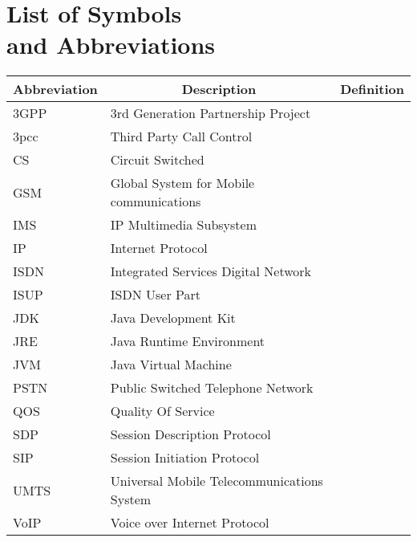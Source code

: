 

\chapter[List of Symbols and Abbreviations]{List of Symbols\\ and Abbreviations}

\begin{center}
\small
\begin{longtable}{lp{3.0in}c}
\toprule
\multicolumn{1}{c}{Abbreviation}
                & \multicolumn{1}{c}{Description}
                                & \multicolumn{1}{c}{Definition}\\ \midrule\addlinespace[2pt] \endhead
\bottomrule\endfoot
3GPP			& 3rd Generation Partnership Project 		& \pref{sym:3GPP}\\
3pcc			& Third Party Call Control						& \pref{sym:3pcc}\\
CS				& Circuit Switched								& \pref{sym:CS}\\
GSM			& Global System for Mobile communications & \pref{sym:GSM}\\
IMS			& IP Multimedia Subsystem						& \pref{sym:IMS}\\
IP				& Internet Protocol								& \pref{sym:IP}\\
ISDN			& Integrated Services Digital Network		& \pref{sym:ISDN}\\
ISUP			& ISDN User Part									& \pref{sym:ISUP}\\
JDK			& Java Development Kit        				& \pref{sym:JDK}\\
JRE			& Java Runtime Environment        			& \pref{sym:JRE}\\
JVM			& Java Virtual Machine        				& \pref{sym:JVM}\\
PSTN			& Public Switched Telephone Network			& \pref{sym:PSTN}\\
QOS			& Quality Of Service								& \pref{sym:QOS}\\
SDP			& Session Description Protocol				& \pref{sym:SDP}\\
SIP			& Session Initiation Protocol					& \pref{sym:SIP}\\
UMTS			& Universal Mobile Telecommunications System & \pref{sym:UMTS}\\
VoIP			& Voice over Internet Protocol				& \pref{sym:VoIP}\\


\end{longtable}
\end{center}

